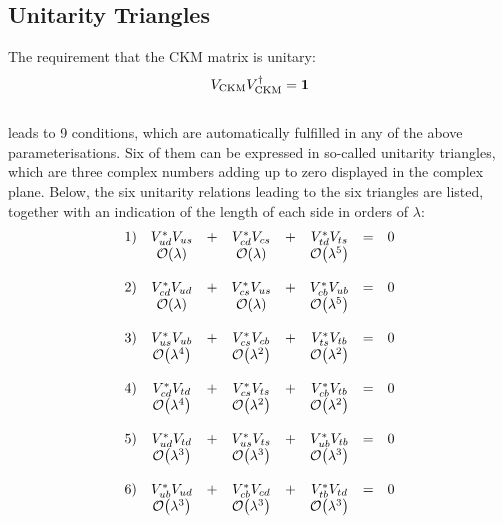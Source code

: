 \subsection{Unitarity Triangles}
\label{sec:th.b.triangles}
The requirement that the CKM matrix is unitary:
\begin{equation}
V_{\mathrm{CKM}} V_{\mathrm{CKM}}^{\dagger} = \mathbf{1}
\end{equation}\\
 leads to 9 conditions, which are automatically fulfilled in any
 of the above parameterisations. Six of them can be expressed in
 so-called unitarity triangles, which are three complex numbers adding
 up to zero displayed in the complex plane. Below, the six unitarity
 relations leading to the six triangles are listed, together with an
 indication of the length of each side in orders of $\lambda$: {\small
\begin{equation}
\label{eq:CKMUnitarity}
\begin{array}{l c c c c c c c}
1)&V_{ud}^{\ast}V_{us}&+&V_{cd}^{\ast}V_{cs}&+&V_{td}^{\ast}V_{ts}&=&0\\
  & \order{\lambda}   & &\order{\lambda}    & & \order{\lambda^5} & & \\
  &                   & &                   & &                   & & \\
2)&V_{cd}^{\ast}V_{ud}&+&V_{cs}^{\ast}V_{us}&+&V_{cb}^{\ast}V_{ub}&=&0\\
  & \order{\lambda}   & &\order{\lambda}    & & \order{\lambda^5} & & \\
  &                   & &                   & &                   & & \\
3)&V_{us}^{\ast}V_{ub}&+&V_{cs}^{\ast}V_{cb}&+&V_{ts}^{\ast}V_{tb}&=&0\\
  & \order{\lambda^4} & &\order{\lambda^2}  & & \order{\lambda^2} & & \\
  &                   & &                   & &                   & & \\
4)&V_{cd}^{\ast}V_{td}&+&V_{cs}^{\ast}V_{ts}&+&V_{cb}^{\ast}V_{tb}&=&0\\
  & \order{\lambda^4} & &\order{\lambda^2}  & & \order{\lambda^2} & & \\
  &                   & &                   & &                   & & \\
5)&V_{ud}^{\ast}V_{td}&+&V_{us}^{\ast}V_{ts}&+&V_{ub}^{\ast}V_{tb}&=&0\\
  & \order{\lambda^3} & &\order{\lambda^3}  & & \order{\lambda^3} & & \\
  &                   & &                   & &                   & & \\
6)&V_{ub}^{\ast}V_{ud}&+&V_{cb}^{\ast}V_{cd}&+&V_{tb}^{\ast}V_{td}&=&0\\
  & \order{\lambda^3} & &\order{\lambda^3}  & & \order{\lambda^3} & & \\
  &                   & &                   & &                   & & \\
\end{array}
\end{equation}}\\
